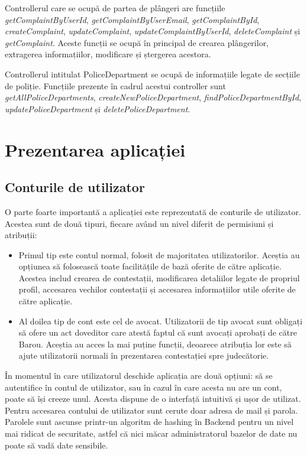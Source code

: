 \documentclass[12pt,a4paper]{report}
\theoremstyle{definition}
\theoremstyle{remark}
\begin{document}
Controllerul care se ocupă de partea de plângeri are funcțiile \emph{getComplaintByUserId}, \emph{getComplaintByUserEmail}, \emph{getComplaintById}, \emph{createComplaint}, \emph{updateComplaint}, \emph{updateComplaintByUserId}, \emph{deleteComplaint} și \emph{getComplaint}. Aceste funcții se ocupă în principal de crearea plângerilor, extragerea informațiilor, modificare și ștergerea acestora.

Controllerul intitulat PoliceDepartment se ocupă de informațiile legate de secțiile de poliție. Funcțiile prezente în cadrul acestui controller sunt \emph{getAllPoliceDepartments}, \emph{createNewPoliceDepartment}, \emph{findPoliceDepartmentById}, \emph{updatePoliceDepartment} și \emph{deletePoliceDepartment}.
\newpage
\chapter{Prezentarea aplicației}
\section{Conturile de utilizator}
O parte foarte importantă a aplicației este reprezentată de conturile de utilizator. Acestea sunt de două tipuri, fiecare având un nivel diferit de permisiuni și atribuții:
\begin{itemize}
  \item  Primul tip este contul normal, folosit de majoritatea utilizatorilor. Aceștia au opțiunea să folosească toate facilitățile de bază oferite de către aplicație. Acestea includ crearea de contestații, modificarea detaliilor legate de propriul profil, accesarea vechilor contestații și accesarea informațiilor utile oferite de către aplicație.
  \item  Al doilea tip de cont este cel de avocat. Utilizatorii de tip avocat sunt obligați să ofere un act doveditor care atestă faptul că sunt avocați aprobați de către Barou. Aceștia au acces la mai puține funcții, deoarece atribuția lor este să ajute utilizatorii normali în prezentarea contestației spre judecătorie.
 
\end{itemize}

În momentul în care utilizatorul deschide aplicația are două opțiuni: să se autentifice în contul de utilizator, sau în cazul în care acesta nu are un cont, poate să își creeze unul. Acesta dispune de o interfață intuitivă și ușor de utilizat. Pentru accesarea contului de utilizator sunt cerute doar adresa de mail și parola. Parolele sunt ascunse printr-un algoritm de hashing în Backend pentru un nivel mai ridicat de securitate, astfel că nici măcar administratorul bazelor de date nu poate să vadă date sensibile.
\end{document}

